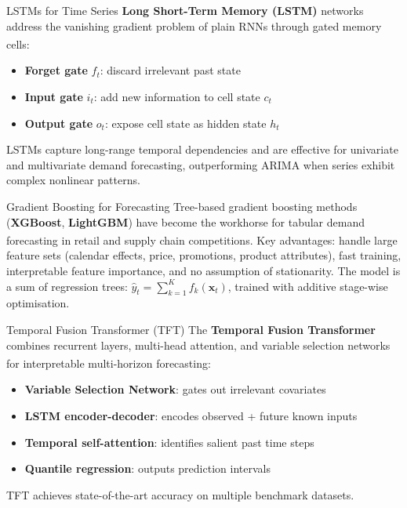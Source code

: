\begin{v3topic}{LSTMs for Time Series}
    \textbf{Long Short-Term Memory (LSTM)} networks address the vanishing gradient problem of plain RNNs through gated memory cells\textsuperscript{\cite[][pp.~1748--1751]{limTemporalFusionTransformers2021}}:
    \begin{itemize}
        \item \textbf{Forget gate} $f_t$: discard irrelevant past state
        \item \textbf{Input gate} $i_t$: add new information to cell state $c_t$
        \item \textbf{Output gate} $o_t$: expose cell state as hidden state $h_t$
    \end{itemize}
    LSTMs capture long-range temporal dependencies and are effective for univariate and multivariate demand forecasting, outperforming ARIMA when series exhibit complex nonlinear patterns.

\end{v3topic}
\begin{v3topic}{Gradient Boosting for Forecasting}
    Tree-based gradient boosting methods (\textbf{XGBoost}, \textbf{LightGBM}) have become the workhorse for tabular demand forecasting in retail and supply chain competitions\textsuperscript{\cite[][p.~905]{huberDataDrivenNewsvendor2019}}.
    Key advantages: handle large feature sets (calendar effects, price, promotions, product attributes), fast training, interpretable feature importance, and no assumption of stationarity.
    The model is a sum of regression trees: $\hat{y}_t = \sum_{k=1}^K f_k(\mathbf{x}_t)$, trained with additive stage-wise optimisation.

\end{v3topic}
\begin{v3topic}{Temporal Fusion Transformer (TFT)}
    The \textbf{Temporal Fusion Transformer} combines recurrent layers, multi-head attention, and variable selection networks for interpretable multi-horizon forecasting\textsuperscript{\cite[][pp.~1748--1764]{limTemporalFusionTransformers2021}}:
    \begin{itemize}
        \item \textbf{Variable Selection Network}: gates out irrelevant covariates
        \item \textbf{LSTM encoder-decoder}: encodes observed + future known inputs
        \item \textbf{Temporal self-attention}: identifies salient past time steps
        \item \textbf{Quantile regression}: outputs prediction intervals
    \end{itemize}
    TFT achieves state-of-the-art accuracy on multiple benchmark datasets.

\end{v3topic}
